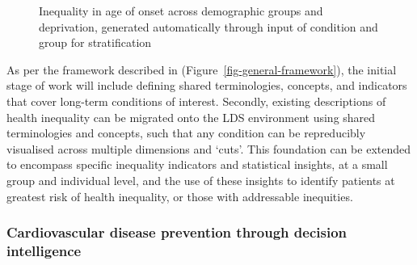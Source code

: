 \documentclass[
  letterpaper,
  DIV=11,
  numbers=noendperiod]{scrartcl}
\begin{document}
\begin{figure}


\caption{\label{fig-onset-time}Inequality in age of onset across
demographic groups and deprivation, generated automatically through
input of condition and group for stratification}

\end{figure}%

As per the framework described in (Figure~\ref{fig-general-framework}),
the initial stage of work will include defining shared terminologies,
concepts, and indicators that cover long-term conditions of interest.
Secondly, existing descriptions of health inequality can be migrated
onto the LDS environment using shared terminologies and concepts, such
that any condition can be repreducibly visualised across multiple
dimensions and `cuts'. This foundation can be extended to encompass
specific inequality indicators and statistical insights, at a small
group and individual level, and the use of these insights to identify
patients at greatest risk of health inequality, or those with
addressable inequities.

\subsubsection{Cardiovascular disease prevention through decision
intelligence}\label{cardiovascular-disease-prevention-through-decision-intelligence}
\end{document}
